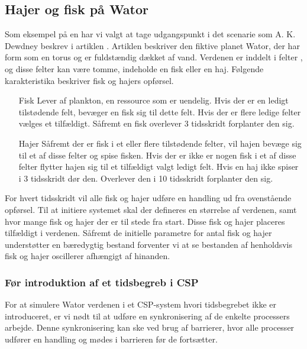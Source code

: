 \subsection{Hajer og fisk på Wator} Som eksempel på en \des har vi valgt at tage 
udgangspunkt i det scenarie som A. K. Dewdney
beskrev i artiklen \cite{wator}. Artiklen beskriver den
fiktive planet Wator, der har form som en torus og er fuldstændig
dækket af vand. Verdenen er inddelt i felter \cite[s. 20]{wator}, og disse felter kan være tomme, indeholde en
fisk eller en haj. Følgende karakteristika beskriver fisk og hajers
opførsel.

\begin{itemize}
\item[Fisk]
Lever af plankton, en ressource som er uendelig. Hvis der er en ledigt 
tilstødende felt, bevæger en fisk sig til dette felt. Hvis der er flere ledige 
felter vælges et tilfældigt. Såfremt en fisk overlever 3 tidsskridt forplanter 
den sig.
\item[Hajer]
Såfremt der er fisk i et eller flere tilstødende felter, vil hajen bevæge sig 
til et af disse felter og spise fisken. Hvis der er ikke er nogen fisk i et af 
disse felter flytter hajen sig til et tilfældigt valgt ledigt felt. Hvis en haj 
ikke spiser i 3 tidsskridt dør den. Overlever den i 10 tidsskridt forplanter 
den sig.
\end{itemize}

For hvert tidsskridt vil alle fisk og hajer udføre en handling ud fra
ovenstående opførsel.
Til at initiere systemet skal der defineres en størrelse af verdenen,
samt hvor mange fisk og hajer der er til stede fra start. Disse fisk og
hajer placeres tilfældigt i verdenen.
Såfremt de initielle parametre for antal fisk og hajer understøtter en 
bæredygtig bestand forventer vi at se bestanden af henholdsvis fisk og hajer 
oscillerer afhængigt af hinanden.

\subsubsection*{Før introduktion af et tidsbegreb i CSP} 
For at simulere Wator verdenen i et CSP-system hvori tidsbegrebet ikke er 
introduceret, er vi nødt til at udføre en synkronisering af de enkelte 
processers arbejde. Denne synkronisering kan ske ved brug af barrierer, hvor 
alle processer udfører en handling og mødes i barrieren før de fortsætter.

